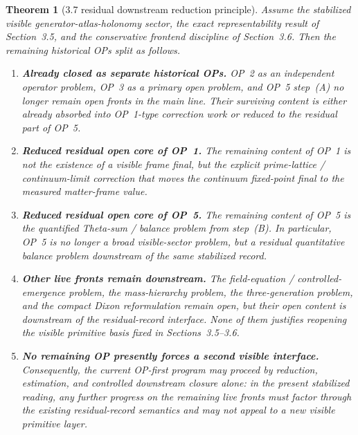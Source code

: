 \documentclass[12pt,a4paper]{article}
\newtheorem{theorem}{Theorem}[section]
\begin{document}
\begin{theorem}[3.7 residual downstream reduction principle]
\label{thm:mainline-3700}
Assume the stabilized visible generator-atlas-holonomy sector, the exact representability result of Section~3.5, and the conservative frontend discipline of Section~3.6. Then the remaining historical OPs split as follows.
\begin{enumerate}[label=(\roman*), leftmargin=2em]
 \item \textbf{Already closed as separate historical OPs.}
 OP~2 as an independent operator problem, OP~3 as a primary open problem, and OP~5 step~(A) no longer remain open fronts in the main line. Their surviving content is either already absorbed into OP~1-type correction work or reduced to the residual part of OP~5.
 \item \textbf{Reduced residual open core of OP~1.}
 The remaining content of OP~1 is not the existence of a visible frame final, but the explicit prime-lattice / continuum-limit correction that moves the continuum fixed-point final to the measured matter-frame value.
 \item \textbf{Reduced residual open core of OP~5.}
 The remaining content of OP~5 is the quantified Theta-sum / balance problem from step~(B). In particular, OP~5 is no longer a broad visible-sector problem, but a residual quantitative balance problem downstream of the same stabilized record.
 \item \textbf{Other live fronts remain downstream.}
 The field-equation / controlled-emergence problem, the mass-hierarchy problem, the three-generation problem, and the compact Dixon reformulation remain open, but their open content is downstream of the residual-record interface. None of them justifies reopening the visible primitive basis fixed in Sections~3.5--3.6.
 \item \textbf{No remaining OP presently forces a second visible interface.}
 Consequently, the current OP-first program may proceed by reduction, estimation, and controlled downstream closure alone: in the present stabilized reading, any further progress on the remaining live fronts must factor through the existing residual-record semantics and may not appeal to a new visible primitive layer.
\end{enumerate}
\end{theorem}
\end{document}
